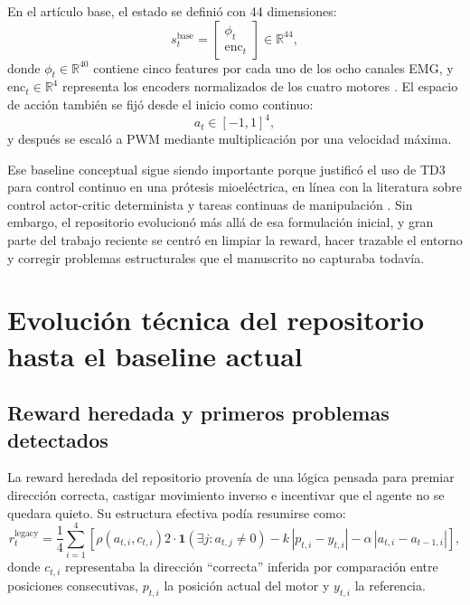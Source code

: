 \documentclass[11pt,a4paper]{article}
\begin{document}
En el art\'iculo base, el estado se defini\'o con 44 dimensiones:
\begin{equation}
s_t^{\text{base}} =
\begin{bmatrix}
\phi_t \\
\mathrm{enc}_t
\end{bmatrix}
\in \mathbb{R}^{44},
\end{equation}
donde \(\phi_t \in \mathbb{R}^{40}\) contiene cinco features por cada uno de los ocho canales EMG, y \(\mathrm{enc}_t \in \mathbb{R}^{4}\) representa los encoders normalizados de los cuatro motores \citep{fuertes2026continuous}. El espacio de acci\'on tambi\'en se fij\'o desde el inicio como continuo:
\begin{equation}
a_t \in [-1,1]^4,
\end{equation}
y despu\'es se escal\'o a PWM mediante multiplicaci\'on por una velocidad m\'axima.

Ese baseline conceptual sigue siendo importante porque justific\'o el uso de TD3 para control continuo en una pr\'otesis mioel\'ectrica, en l\'inea con la literatura sobre control actor-critic determinista y tareas continuas de manipulaci\'on \citep{fujimoto2018td3,mathworks_td3_agent,chen2023review}. Sin embargo, el repositorio evolucion\'o m\'as all\'a de esa formulaci\'on inicial, y gran parte del trabajo reciente se centr\'o en limpiar la reward, hacer trazable el entorno y corregir problemas estructurales que el manuscrito no capturaba todav\'ia.

\section{Evoluci\'on t\'ecnica del repositorio hasta el baseline actual}

\subsection{Reward heredada y primeros problemas detectados}

La reward heredada del repositorio proven\'ia de una l\'ogica pensada para premiar direcci\'on correcta, castigar movimiento inverso e incentivar que el agente no se quedara quieto. Su estructura efectiva pod\'ia resumirse como:
\begin{equation}
r_t^{\text{legacy}}
=
\frac{1}{4}\sum_{i=1}^{4}
\left[
\rho(a_{t,i}, c_{t,i})
2 \cdot \mathbf{1}(\exists j: a_{t,j}\neq 0)
-k \, |p_{t,i} - y_{t,i}|
-\alpha \, |a_{t,i} - a_{t-1,i}|
\right],
\end{equation}
donde \(c_{t,i}\) representaba la direcci\'on ``correcta'' inferida por comparaci\'on entre posiciones consecutivas, \(p_{t,i}\) la posici\'on actual del motor y \(y_{t,i}\) la referencia.
\end{document}
